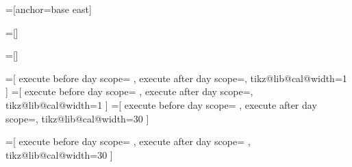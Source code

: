 =[anchor=base east]

=[]

=[]

\def\tikzdaycode{\node[name=\pgfcalendarsuggestedname,every day]{\tikzdaytext};}
\def\tikzmonthcode{\node[every month]{\tikzmonthtext};}
\def\tikzyearcode{\node[every year]{\tikzyeartext};}

\def\tikzdaytext{\%d-}
\def\tikzmonthtext{\%mt}
\def\tikzyeartext{\%y0}




\def\tikz@lib@cal@width{1}

%
%

=[%
  execute before day scope={
  },  
  execute after day scope={\pgfmathsetlength{\pgf@y}{\tikz@lib@cal@yshift}\pgftransformyshift{-\pgf@y}},
  tikz@lib@cal@width=1
]
=[%
  execute before day scope={
  },  
  execute after day scope={\pgftransformyshift\tikz@lib@cal@yshift},
  tikz@lib@cal@width=1
]
=[%
  execute before day scope={
  },  
  execute after day scope={\pgftransformxshift\tikz@lib@cal@xshift},
  tikz@lib@cal@width=30%
]

=[%
  execute before day scope={
  },  
  execute after day scope={
    \pgfmathsetlength{\pgf@x}{\tikz@lib@cal@xshift}
    \pgftransformxshift{-\pgf@x}%
  },
  tikz@lib@cal@width=30%
]




